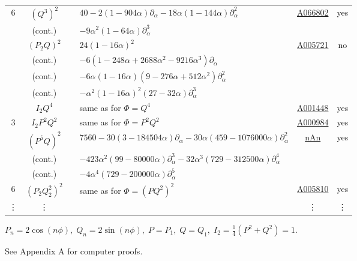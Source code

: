 \documentclass[nofootinbib,preprint]{revtex4-1}
\begin{document}
\begin{table}[p]
\begin{center}
\begin{tabularx}{\textwidth}{ c | c | c l | c   | c  }
6           &  $(Q^3)^2$        && $40 - 2 (1 - 904 \alpha)\partial_{\alpha} - 18 \alpha (1 - 144 \alpha)\partial_{\alpha}^2$  
            & \href{https://oeis.org/A066802}{A066802} 
            &  yes \\
            & \tiny (cont.)       && \hspace{0.5cm} $ -9 \alpha^2 (1 - 64 \alpha)\partial_{\alpha}^3$                   
            & &    \\
            &  $(P_2 Q)^2$  && $24 (1 - 16 \alpha)^2 $ 
            & \href{https://oeis.org/A005721}{A005721} 
            &  no \\           
            & \tiny (cont.)       && \hspace{0.5cm} $ -6 (1 - 248 \alpha + 2688 \alpha^2 - 9216 \alpha^3)\partial_{\alpha}$                   
            & &     \\
            & \tiny (cont.)       && \hspace{0.5cm} $ -6 \alpha (1 - 16 \alpha) (9 - 276 \alpha + 512 \alpha^2)\partial_{\alpha}^2$                   
            & &     \\
            & \tiny (cont.)       && \hspace{0.5cm} $ -\alpha^2 (1 - 16 \alpha)^2 (27 - 32 \alpha)\partial_{\alpha}^3$                   
            & &    \\
            \hline
            &  $I_2 Q^4$      && same as for $\Phi=Q^4$   
            & \href{https://oeis.org/A001448}{A001448} 
            &  yes \\
3           &  $I_2 P^2 Q^2$  && same as for $\Phi=P^2 Q^2$ 
            & \href{https://oeis.org/A000984}{A000984} 
            &  yes\\
\hline
            &  $(P^5 Q)^2$        && $7560-30(3-184504\alpha)\partial_{\alpha}-30\alpha(459-1076000\alpha)\partial_{\alpha}^2 $
            & \href{https://oeis.org/AXXXXXX}{nAn}  
            &  yes \\
            & \tiny (cont.)       && \hspace{0.5cm} $-423\alpha^2(99-80000\alpha)\partial_\alpha^3-32\alpha^3 (729 - 312500 \alpha)\partial_{\alpha}^4$                   
            & &    \\
            & \tiny (cont.)       && \hspace{0.5cm} $- 4 {\alpha}^4 (729 - 200000 \alpha)\partial_{\alpha}^5$                   
            & &    \\
6           &  $(P_2 Q_2^2)^2$    && same as for $\Phi=(P Q^2)^2$
            & \href{https://oeis.org/A005810}{A005810} 
            &  yes  \\
 \vdots   &  \vdots          &&   & \vdots  & \vdots   \\
\hline            
\end{tabularx}
\phantom{\;}
$P_n=2\cos(n\phi),\;Q_n=2\sin(n\phi),\;P=P_1,\;Q=Q_1, \;I_2=\frac{1}{4}(P^2+Q^2)=1$. 

See Appendix A for computer proofs.
\end{center}
\end{table} 
\end{document}

